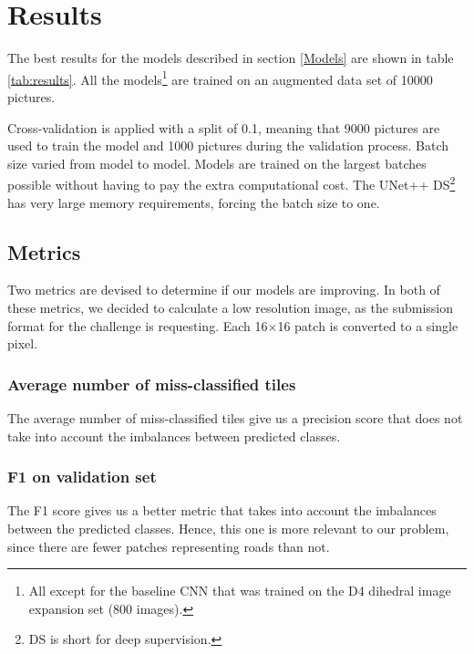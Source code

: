 \documentclass[10pt,conference,a4paper]{IEEEtran}
\begin{document}
\section{Results}

The best results for the models described in section \ref{Models} are shown in table \ref{tab:results}.
All the models\footnote{\label{foot:baseCnn}All except for the baseline CNN that was trained on the D4 dihedral image expansion set (800 images).} are trained on an augmented data set of 10000 pictures. 

Cross-validation is applied with a split of 0.1, meaning that 9000 pictures are used to train the model and 1000 pictures during the validation process.
Batch size varied from model to model.
Models are trained on the largest batches possible without having to pay the extra computational cost.
The UNet++ DS\footnote{DS is short for deep supervision.} has very large memory requirements, forcing the batch size to one.

\subsection{Metrics}

Two metrics are devised to determine if our models are improving.
In both of these metrics, we decided to calculate a low resolution image, as the submission format for the challenge is requesting.
Each 16$\times$16 patch is converted to a single pixel.

\subsubsection{Average number of miss-classified tiles}

The average number of miss-classified tiles give us a precision score that does not take into account the imbalances between predicted classes.

\subsubsection{F1 on validation set}
\label{sec:F1 metric}

The F1 score gives us a better metric that takes into account the imbalances between the predicted classes.
Hence, this one is more relevant to our problem, since there are fewer patches representing roads than not.
\end{document}
